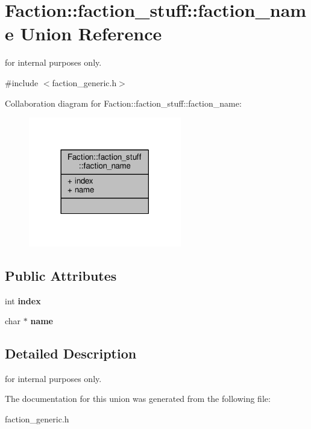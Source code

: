 \hypertarget{unionFaction_1_1faction__stuff_1_1faction__name}{}\section{Faction\+:\+:faction\+\_\+stuff\+:\+:faction\+\_\+name Union Reference}
\label{unionFaction_1_1faction__stuff_1_1faction__name}


for internal purposes only.  




{\ttfamily \#include $<$faction\+\_\+generic.\+h$>$}



Collaboration diagram for Faction\+:\+:faction\+\_\+stuff\+:\+:faction\+\_\+name\+:
\nopagebreak
\begin{figure}[H]
\begin{center}
\leavevmode
\includegraphics[width=189pt]{d8/d19/unionFaction_1_1faction__stuff_1_1faction__name__coll__graph}
\end{center}
\end{figure}
\subsection*{Public Attributes}
\begin{DoxyCompactItemize}
\item 
int {\bfseries index}\hypertarget{unionFaction_1_1faction__stuff_1_1faction__name_a05aada700276b2b289c5b6ead06b84b2}{}\label{unionFaction_1_1faction__stuff_1_1faction__name_a05aada700276b2b289c5b6ead06b84b2}

\item 
char $\ast$ {\bfseries name}\hypertarget{unionFaction_1_1faction__stuff_1_1faction__name_a8ce73162e3a49df6e74be113dac3711a}{}\label{unionFaction_1_1faction__stuff_1_1faction__name_a8ce73162e3a49df6e74be113dac3711a}

\end{DoxyCompactItemize}


\subsection{Detailed Description}
for internal purposes only. 

The documentation for this union was generated from the following file\+:\begin{DoxyCompactItemize}
\item 
faction\+\_\+generic.\+h\end{DoxyCompactItemize}
